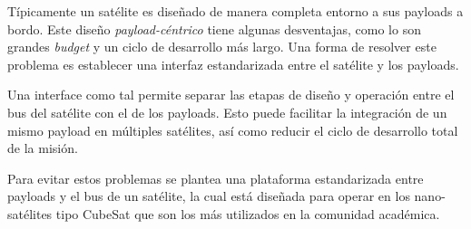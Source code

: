 \begin{preface}
\begin{myAbstract}
%


Típicamente un satélite es diseñado de manera completa entorno a sus payloads a bordo. Este diseño \textit{payload-céntrico} tiene algunas desventajas, como lo son grandes \textit{budget} y un ciclo de desarrollo más largo. Una forma de resolver este problema es establecer una interfaz estandarizada entre el satélite y los payloads. 

Una interface como tal permite separar las etapas de diseño y operación entre el bus del satélite con el de los payloads. Esto puede facilitar la integración de un mismo payload en múltiples satélites, así como reducir el ciclo de desarrollo total de la misión.

Para evitar estos problemas se plantea una plataforma estandarizada entre payloads y el bus de un satélite, la cual está diseñada para operar en los nano-satélites tipo CubeSat que son los más utilizados en la comunidad académica.



\end{myAbstract}
\end{preface}
